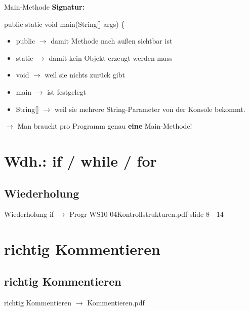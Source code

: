 \documentclass[18pt]{beamer}
\begin{document}

\begin{frame}{Main-Methode}
	\textbf{Signatur:}

	public static void main(String[] args) \{
	
	\begin{itemize}
		\item public \pause $\rightarrow$ damit Methode nach außen sichtbar ist \pause
		\item static \pause $\rightarrow$ damit kein Objekt erzeugt werden muss \pause
		\item void \pause $\rightarrow$ weil sie nichts zurück gibt \pause
		\item main \pause $\rightarrow$ ist festgelegt \pause
		\item String[] \pause $\rightarrow$ weil sie mehrere String-Parameter von der Konsole bekommt.
	\end{itemize}
	
	$\rightarrow$ Man braucht pro Programm genau \textbf{eine} Main-Methode!
\end{frame}


\section{Wdh.: if / while / for}
\subsection{Wiederholung}
\begin{frame}{Wiederholung if}
	$\rightarrow$ Progr WS10 04Kontrollstrukturen.pdf slide 8 - 14
\end{frame}


\section{richtig Kommentieren}
\subsection{richtig Kommentieren}
\begin{frame}{richtig Kommentieren}
	$\rightarrow$ Kommentieren.pdf
\end{frame}
\end{document}
